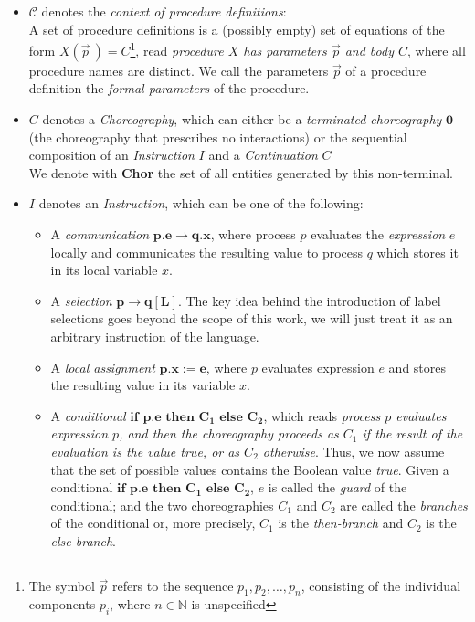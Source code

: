 \documentclass[12pt,a4paper,twoside]{book}
\begin{document}
\begin{itemize}
\item $\mathscr{C}$ denotes the \textit{context of procedure definitions}:\\
	A set of procedure definitions is a (possibly empty) set of equations of the form $X(\vec{p}~) = C$\footnote{The symbol \( \vec{p} \) refers to the sequence \( p_1, p_2, \dots, p_n \), consisting of the individual components \( p_i \), where \( n \in \mathbb{N} \) is unspecified}, read \textit{procedure $X$ has parameters $\vec{p}$ and body $C$}, where all procedure names are distinct. We call the parameters $\vec{p}$ of a procedure definition the \textit{formal parameters} of the procedure.
\item $C$ denotes a \textit{Choreography}, which can either be a \textit{terminated choreography} $\boldsymbol{0}$ (the choreography that prescribes no interactions) or the sequential composition of an \textit{Instruction} $I$ and a \textit{Continuation} $C$\\
We denote with \textbf{Chor} the set of all entities generated by this non-terminal.
\item $I$ denotes an \textit{Instruction}, which can be one of the following:
\begin{itemize}
	\item A \emph{communication} $\bm{p.e \rightarrow q.x}$, where process $p$ evaluates the \emph{expression} $e$ locally and communicates the resulting value to process $q$ which stores it in its local variable $x$.
	\item A \emph{selection} $\bm{p \rightarrow q[L]}$. The key idea behind the introduction of label selections goes beyond the scope of this work, we will just treat it as an arbitrary instruction of the language.
	\item A \emph{local assignment} $\bm{p.x := e}$, where $p$ evaluates expression $e$ and stores the resulting value in its variable $x$.
	\item A \emph{conditional} $\bm{\textbf{if } p.e \textbf{ then } C_1 \textbf{ else } C_2}$, which reads \textit{process $p$ evaluates expression $p$, and then the choreography proceeds as $C_1$ if the result of the evaluation is the value \textit{true}, or as $C_2$ otherwise}. Thus, we now assume that the set of possible values contains the Boolean value \textit{true}. Given a conditional $\bm{\textbf{if } p.e \textbf{ then } C_1 \textbf{ else } C_2}$, $e$ is called the \textit{guard} of the conditional; and the two choreographies $C_1$ and $C_2$ are called the \textit{branches} of the conditional or, more precisely, $C_1$ is the \textit{then-branch} and $C_2$ is the \textit{else-branch}.

\end{itemize}
\end{itemize}
\end{document}
